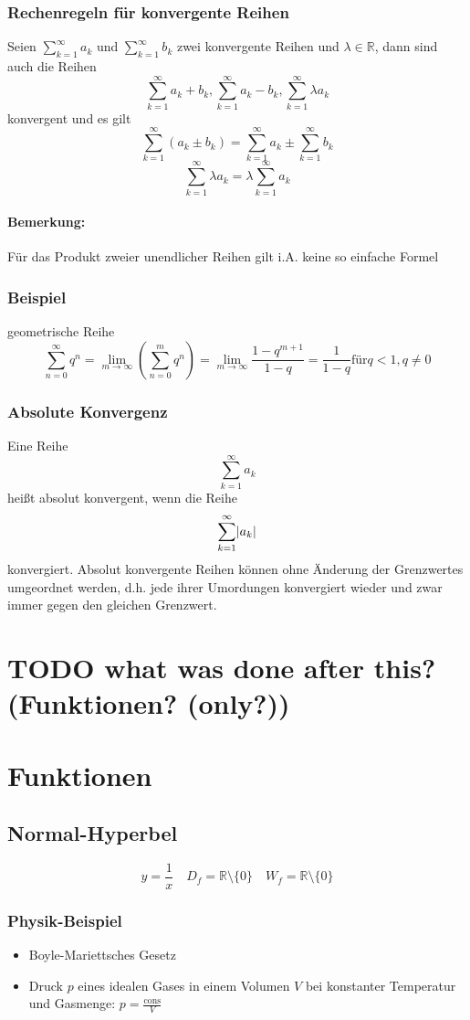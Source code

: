 \documentclass[a4paper]{scrartcl}
\DeclarePairedDelimiter\abs{\lvert}{\rvert}%
\begin{document}
\subsubsection{Rechenregeln für konvergente Reihen}
\label{sec-3-2-2}
Seien $\sum_{k=1}^\infty a_k$ und $\sum_{k=1}^\infty b_k$ zwei konvergente Reihen und $\lambda\in\mathbb{R}$, dann sind auch die Reihen \[\sum_{k=1}^\infty a_k + b_k, \sum_{k=1}^\infty a_k - b_k, \sum_{k=1}^\infty \lambda a_k\] konvergent und es gilt
\[\sum_{k=1}^\infty(a_k \pm b_k) = \sum_{k=1}^\infty a_k \pm \sum_{k=1}^\infty b_k\]
\[\sum_{k=1}^\infty \lambda a_k = \lambda \sum_{k=1}^\infty a_k\]
\paragraph{Bemerkung:}
\label{sec-3-2-2-1}
Für das Produkt zweier unendlicher Reihen gilt i.A. keine so einfache Formel
\subsubsection{Beispiel}
\label{sec-3-2-3}
geometrische Reihe \[\sum_{n=0}^\infty q^n = \lim_{m\to\infty}(\sum_{n=0}^m q^n) = \lim_{m\to\infty}\frac{1-q^{m+1}}{1-q} = \frac{1}{1-q} \text{für} q < 1, q\neq 0\]
\subsubsection{Absolute Konvergenz}
\label{sec-3-2-4}
Eine Reihe \[\sum_{k=1}^\infty a_k\] heißt absolut konvergent, wenn die Reihe \[\sum_{k=1}^\infty\abs{a_k}\] konvergiert. Absolut konvergente Reihen können ohne Änderung der Grenzwertes umgeordnet werden, d.h. jede ihrer Umordungen konvergiert wieder und zwar immer gegen den gleichen Grenzwert.
\section{{\bfseries\sffamily TODO} what was done after this? (Funktionen? (only?))}
\label{sec-4}
\section{Funktionen}
\label{sec-5}
\subsection{Normal-Hyperbel}
\label{sec-5-1}
\[y=\frac{1}{x}\quad D_f=\mathbb{R}\setminus\{0\}\quad W_f=\mathbb{R}\setminus\{0\}\]
\subsubsection{Physik-Beispiel}
\label{sec-5-1-1}
\begin{itemize}
\item Boyle-Mariettsches Gesetz
\item Druck $p$ eines idealen Gases in einem Volumen $V$ bei konstanter Temperatur und Gasmenge: $p = \frac{\text{cons}}{V}$
\end{itemize}
\end{document}
